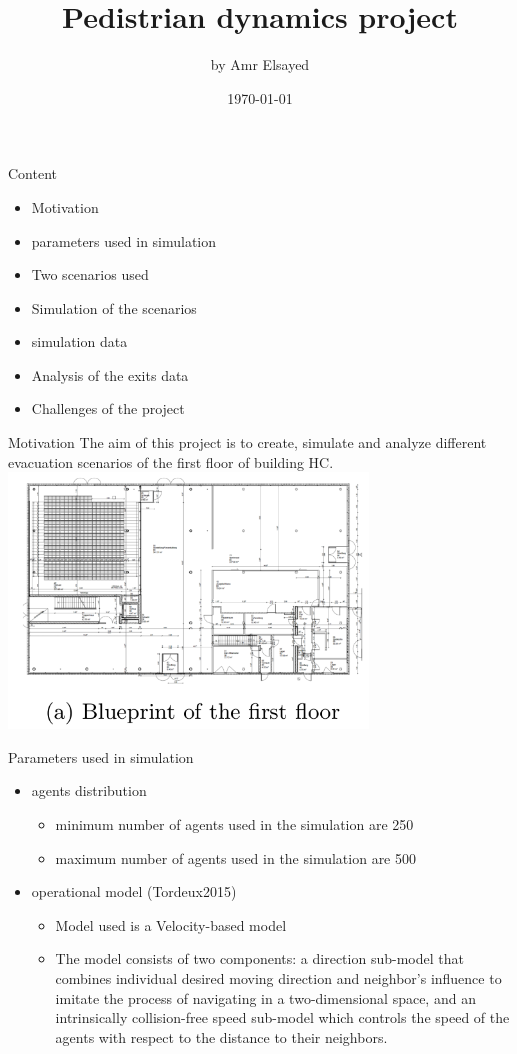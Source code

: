 \documentclass{beamer}
\title{Pedistrian dynamics project}
\author{by Amr Elsayed}
\date{\today}
\begin{document}
\maketitle

\begin{frame}{Content}
\begin{itemize}
\item Motivation
\item parameters used in simulation 
\item Two scenarios used  
\item Simulation of the scenarios
\item simulation data
\item Analysis of the exits data
\item Challenges of the project
\end{itemize}
\end{frame}

\begin{frame}{Motivation}
The aim of this project is to create, simulate and analyze different evacuation
scenarios of the first floor of building HC.
\includegraphics[height=6.8cm]{blueprint.png}
\end{frame}

\begin{frame}{Parameters used in simulation}
\begin{itemize}
\item agents distribution
\begin{itemize}
    \item minimum number of agents used in the simulation are 250
    \item maximum number of agents used in the simulation are 500
\end{itemize}
\item operational model (Tordeux2015)
\begin{itemize}
    \item Model used is a Velocity-based model
    \item The model consists of two components: a direction sub-model that combines individual desired moving direction and neighbor's influence to imitate the process of navigating in a two-dimensional space, and an intrinsically collision-free speed sub-model which controls the speed of the agents with respect to the distance to their neighbors. 
\end{itemize}
\end{itemize}
\end{frame}
\end{document}
